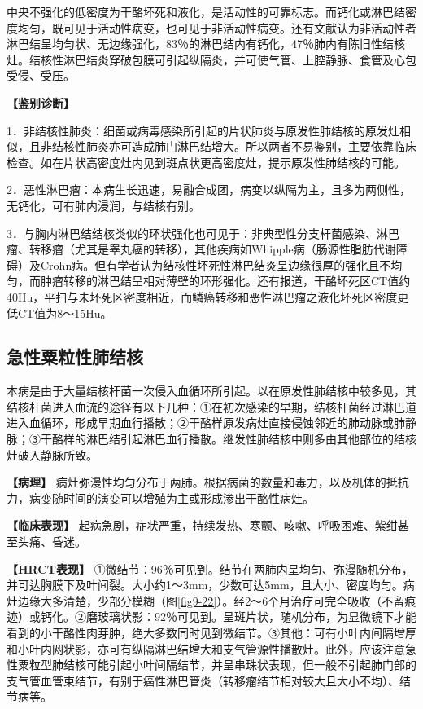 中央不强化的低密度为干酪坏死和液化，是活动性的可靠标志。而钙化或淋巴结密度均匀，既可见于活动性病变，也可见于非活动性病变。还有文献认为非活动性者淋巴结呈均匀状、无边缘强化，83％的淋巴结内有钙化，47％肺内有陈旧性结核灶。结核性淋巴结炎穿破包膜可引起纵隔炎，并可使气管、上腔静脉、食管及心包受侵、受压。

\textbf{【鉴别诊断】}

1．非结核性肺炎：细菌或病毒感染所引起的片状肺炎与原发性肺结核的原发灶相似，且非结核性肺炎亦可造成肺门淋巴结增大。所以两者不易鉴别，主要依靠临床检查。如在片状高密度灶内见到斑点状更高密度灶，提示原发性肺结核的可能。

2．恶性淋巴瘤：本病生长迅速，易融合成团，病变以纵隔为主，且多为两侧性，无钙化，可有肺内浸润，与结核有别。

3．与胸内淋巴结结核类似的环状强化也可见于：非典型性分支杆菌感染、淋巴瘤、转移瘤（尤其是睾丸癌的转移），其他疾病如Whipple病（肠源性脂肪代谢障碍）及Crohn病。但有学者认为结核性坏死性淋巴结炎呈边缘很厚的强化且不均匀，而肿瘤转移的淋巴结呈相对薄壁的环形强化。还有报道，干酪坏死区CT值约40Hu，平扫与未坏死区密度相近，而鳞癌转移和恶性淋巴瘤之液化坏死区密度更低CT值为8～15Hu。

\subsection{急性粟粒性肺结核}

本病是由于大量结核杆菌一次侵入血循环所引起。以在原发性肺结核中较多见，其结核杆菌进入血流的途径有以下几种：①在初次感染的早期，结核杆菌经过淋巴道进入血循环，形成早期血行播散；②干酪样原发病灶直接侵蚀邻近的肺动脉或肺静脉；③干酪样的淋巴结引起淋巴血行播散。继发性肺结核中则多由其他部位的结核灶破入静脉所致。

\textbf{【病理】}
病灶弥漫性均匀分布于两肺。根据病菌的数量和毒力，以及机体的抵抗力，病变随时间的演变可以增殖为主或形成渗出干酪性病灶。

\textbf{【临床表现】}
起病急剧，症状严重，持续发热、寒颤、咳嗽、呼吸困难、紫绀甚至头痛、昏迷。

\textbf{【HRCT表现】}
①微结节：96％可见到。结节在两肺内呈均匀、弥漫随机分布，并可达胸膜下及叶间裂。大小约1～3mm，少数可达5mm，且大小、密度均匀。病灶边缘大多清楚，少部分模糊（图\ref{fig9-22}）。经2～6个月治疗可完全吸收（不留痕迹）或钙化。②磨玻璃状影：92％可见到。呈斑片状，随机分布，为显微镜下才能看到的小干酪性肉芽肿，绝大多数同时见到微结节。③其他：可有小叶内间隔增厚和小叶内网状影，亦可有纵隔淋巴结增大和支气管源性播散灶。此外，应该注意急性粟粒型肺结核可能引起小叶间隔结节，并呈串珠状表现，但一般不引起肺门部的支气管血管束结节，有别于癌性淋巴管炎（转移瘤结节相对较大且大小不均）、结节病等。

